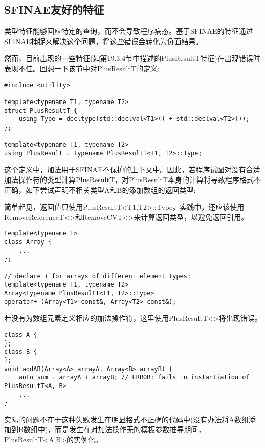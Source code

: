 \subsection{SFINAE友好的特征}

类型特征能够回应特定的查询，而不会导致程序病态。基于SFINAE的特征通过SFINAE捕捉来解决这个问题，将这些错误会转化为负面结果。

然而，目前出现的一些特征(如第19.3.4节中描述的PlusResultT特征)在出现错误时表现不佳。回想一下该节中对PlusResultT的定义:

\begin{lstlisting}[style=styleCXX]
#include <utility>

template<typename T1, typename T2>
struct PlusResultT {
	using Type = decltype(std::declval<T1>() + std::declval<T2>());
};

template<typename T1, typename T2>
using PlusResult = typename PlusResultT<T1, T2>::Type;
\end{lstlisting}

这个定义中，加法用于SFINAE不保护的上下文中。因此，若程序试图对没有合适加法操作符的类型计算PlusResultT，对PlusResultT本身的计算将导致程序格式不正确，如下尝试声明不相关类型A和B的添加数组的返回类型:

\begin{tcolorbox}[colback=webgreen!5!white,colframe=webgreen!75!black]
\hspace*{0.75cm}简单起见，返回值只使用PlusResultT<T1,T2>::Type。实践中，还应该使用RemoveReferenceT<>和RemoveCVT<>来计算返回类型，以避免返回引用。
\end{tcolorbox}

\begin{lstlisting}[style=styleCXX]
template<typename T>
class Array {
	...
};

// declare + for arrays of different element types:
template<typename T1, typename T2>
Array<typename PlusResultT<T1, T2>::Type>
operator+ (Array<T1> const&, Array<T2> const&);
\end{lstlisting}

若没有为数组元素定义相应的加法操作符，这里使用PlusResultT<>将出现错误。

\begin{lstlisting}[style=styleCXX]
class A {
};
class B {
};
void addAB(Array<A> arrayA, Array<B> arrayB) {
	auto sum = arrayA + arrayB; // ERROR: fails in instantiation of PlusResultT<A, B>
	...
}
\end{lstlisting}

实际的问题不在于这种失败发生在明显格式不正确的代码中(没有办法将A数组添加到B数组中)，而是发生在对加法操作无的模板参数推导期间，PlusResultT<A,B>的实例化。


